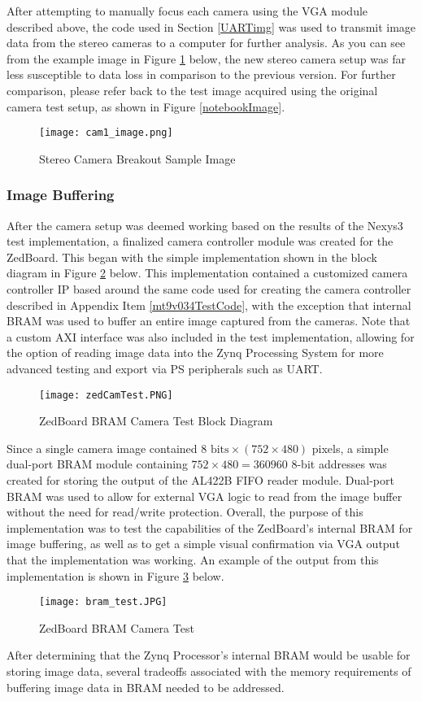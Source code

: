\par
After attempting to manually focus each camera using the VGA module described above, the code used in Section \ref{UARTimg} was used to transmit image data from the stereo cameras to a computer for further analysis. As you can see from the example image in Figure \ref{newBoardImage} below, the new stereo camera setup was far less susceptible to data loss in comparison to the previous version. For further comparison, please refer back to the test image acquired using the original camera test setup, as shown in Figure \ref{notebookImage}.
\begin{figure}[H] 
	\centering
	\texttt{[image: cam1\_image.png]}
	\caption{Stereo Camera Breakout Sample Image}
	\label{newBoardImage}
\end{figure}

\subsubsection{Image Buffering}
After the camera setup was deemed working based on the results of the Nexys3 test implementation, a finalized camera controller module was created for the ZedBoard. This began with the simple implementation shown in the block diagram in Figure \ref{zedCamTest} below. This implementation contained a customized camera controller IP based around the same code used for creating the camera controller described in Appendix Item \ref{mt9v034TestCode}, with the exception that internal BRAM was used to buffer an entire image captured from the cameras. Note that a custom AXI interface was also included in the test implementation, allowing for the option of reading image data into the Zynq Processing System for more advanced testing and export via PS peripherals such as UART. 
\begin{figure}[H] 
	\centering
	\texttt{[image: zedCamTest.PNG]}
	\caption{ZedBoard BRAM Camera Test Block Diagram}
	\label{zedCamTest}
\end{figure}
\par
Since a single camera image contained $8 \textrm{ bits} \times (752\times 480)$ pixels, a simple dual-port BRAM module containing $752\times480=360960$ 8-bit addresses was created for storing the output of the AL422B FIFO reader module. Dual-port BRAM was used to allow for external VGA logic to read from the image buffer without the need for read/write protection. Overall, the purpose of this implementation was to test the capabilities of the ZedBoard's internal BRAM for image buffering, as well as to get a simple visual confirmation via VGA output that the implementation was working. An example of the output from this implementation is shown in Figure \ref{bramCamTest} below. 
\begin{figure}[H] 
	\centering
	\texttt{[image: bram\_test.JPG]}
	\caption{ZedBoard BRAM Camera Test}
	\label{bramCamTest}
\end{figure}
\par
After determining that the Zynq Processor's internal BRAM would be usable for storing image data, several tradeoffs associated with the memory requirements of buffering image data in BRAM needed to be addressed. 

